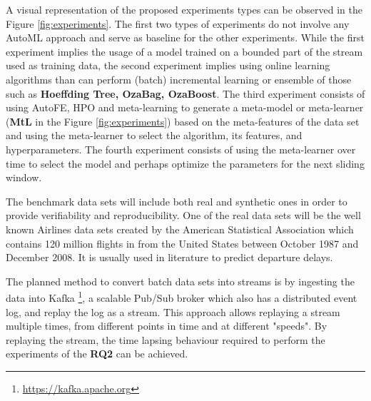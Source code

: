 \documentclass{sig-alternate-br}
\begin{document}
A visual representation of the proposed experiments types can be observed in the Figure \ref{fig:experiments}. The first two types of experiments do not involve any AutoML approach and serve as baseline for the other experiments. While the first experiment implies the usage of a model trained on a bounded part of the stream used as training data, the second experiment implies using online learning algorithms than can perform (batch) incremental learning or ensemble of those such as \textbf{Hoeffding Tree, OzaBag, OzaBoost}. The third experiment consists of using AutoFE, HPO and meta-learning to generate a meta-model or meta-learner (\textbf{MtL} in the Figure \ref{fig:experiments}) based on the meta-features of the data set and using the meta-learner to select the algorithm, its features, and hyperparameters. The fourth experiment consists of using the meta-learner over time to select the model and perhaps optimize the parameters for the next sliding window. 



The benchmark data sets will include both real and synthetic ones in order to provide verifiability and reproducibility. One of the real data sets will be the well known Airlines data sets created by the American Statistical Association which contains 120 million flights in from the United States between October 1987 and December 2008. It is usually used in literature to predict departure delays. 


The planned method to convert batch data sets into streams is by ingesting the data into Kafka \footnote{\url{https://kafka.apache.org}}, a scalable Pub/Sub broker which also has a distributed event log, and replay the log as a stream. This approach allows replaying a stream multiple times, from different points in time and at different "speeds". By replaying the stream, the time lapsing behaviour required to perform the experiments of the \textbf{RQ2} can be achieved. 
\end{document}
